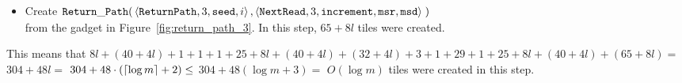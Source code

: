 \begin{itemize}
    \item Create
    $\begin{aligned}[t]
        \returnpath(&\left\langle {\tt ReturnPath}, 3, {\tt seed}, i                        \right\rangle,
                     \left\langle {\tt NextRead},   3, {\tt increment}, {\tt msr}, {\tt msd}\right\rangle \;)
    \end{aligned}$\\from the gadget in Figure~\ref{fig:return_path_3}.
    In this step, $65 + 8l$ tiles were created.
\end{itemize}
%
This means that $8l + (40 + 4l) + 1 + 1 + 1 + 25 + 8l + (40 + 4l) + (32 + 4l) + 3 + 1 + 29 + 1 + 25 + 8l + (40 + 4l) + (65 + 8l) =$
%
$304 + 48l =$
%
$304 + 48 \cdot \left( \ceil*{\log m} + 2 \right) \leq $
%
$304 + 48 \left( {\log m} + 3 \right) =$
%
$O \left( {\log m} \right) $ tiles were created in this step.
%

